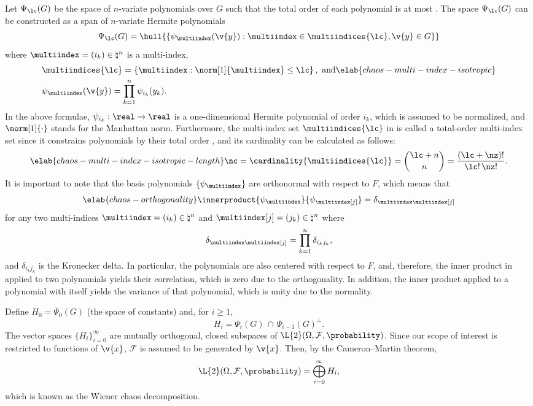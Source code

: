 Let $\Psi_\lc(G)$ be the space of $n$-variate polynomials over $G$ such that the
total order of each polynomial is at most \lc. The space $\Psi_\lc(G)$ can be
constructed as a span of $n$-variate Hermite polynomials \cite{eldred2008,
maitre2010}
\[
  \Psi_\lc(G) = \hull{\left\{ \psi_{\multiindex}(\v{y}): \multiindex \in \multiindices{\lc}, \v{y} \in G \right\}}
\]
where $\multiindex = (i_k) \in \natural^n$ is a multi-index,
\begin{align}
  & \multiindices{\lc} = \left\{ \multiindex: \norm[1]{\multiindex} \leq \lc \right\}, \text{ and} \elab{chaos-multi-index-isotropic} \\
  & \psi_{\multiindex}(\v{y}) = \prod_{k = 1}^n \psi_{i_k}(y_k). \nonumber
\end{align}
In the above formulae, $\psi_{i_k}: \real \to \real$ is a one-dimensional
Hermite polynomial of order $i_k$, which is assumed to be normalized, and
$\norm[1]{\cdot}$ stands for the Manhattan norm. Furthermore, the multi-index
set $\multiindices{\lc}$ in  is called a
total-order multi-index set since it constrains polynomials by their total order
\cite{eldred2008, beck2011}, and its cardinality can be calculated as follows:
\begin{equation} \elab{chaos-multi-index-isotropic-length}
  \nc = \cardinality{\multiindices{\lc}} = {\lc + n \choose n} = \frac{(\lc + \nz)!}{\lc! \, \nz!}.
\end{equation}
It is important to note that the basis polynomials $\{ \psi_{\multiindex} \}$
are orthonormal with respect to $F$, which means that
\begin{equation} \elab{chaos-orthogonality}
  \innerproduct{\psi_{\multiindex}}{\psi_{\multiindex[j]}} = \delta_{\multiindex \multiindex[j]}
\end{equation}
for any two multi-indices $\multiindex = (i_k) \in \natural^n$ and
$\multiindex[j] = (j_k) \in \natural^n$ where
\[
  \delta_{\multiindex \multiindex[j]} = \prod_{k = 1}^n \delta_{i_k j_k},
\]
and $\delta_{i_k j_k}$ is the Kronecker delta. In particular, the polynomials
are also centered with respect to $F$, and, therefore, the inner product in
 applied to two polynomials yields their correlation,
which is zero due to the orthogonality. In addition, the inner product applied
to a polynomial with itself yields the variance of that polynomial, which is
unity due to the normality.

Define $H_0 = \Psi_0(G)$ (the space of constants) and, for $i \geq 1$,
\[
  H_i = \Psi_i(G) \, \cap \, \Psi_{i - 1}(G)^\perp.
\]
The vector spaces $\{ H_i \}_{i = 0}^\infty$ are mutually orthogonal, closed
subspaces of $\L{2}(\Omega, \mathcal{F}, \probability)$. Since our scope of
interest is restricted to functions of $\v{x}$, $\mathcal{F}$ is assumed to be
generated by $\v{x}$. Then, by the Cameron--Martin theorem,
\[
  \L{2}(\Omega, \mathcal{F}, \probability) = \bigoplus_{i = 0}^\infty H_i,
\]
which is known as the Wiener chaos decomposition.

